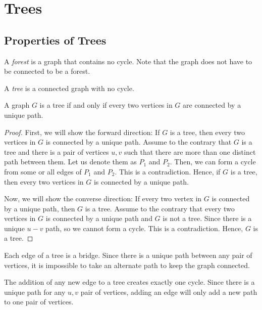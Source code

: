 \chapter{Trees}

\section{Properties of Trees}

\begin{definition}[Forests]
  A \textit{forest} is a graph that contains no cycle. Note that the graph 
  does not have to be connected to be a forest.
\end{definition}

\begin{definition}[Trees]
  A \textit{tree} is a connected graph with no cycle.
\end{definition}

\begin{theorem}
  A graph \(G\) is a tree if and only if every two vertices in \(G\) are
  connected by a unique path.
\end{theorem}

\begin{proof}
  First, we will show the forward direction: If \(G\) is a tree, then every two
  vertices in \(G\) is connected by a unique path. Assume to the contrary that
  \(G\) is a tree and there is a pair of vertices \(u, v\) such that there are 
  more than one distinct path between them. Let us denote them as \(P_1\) and
  \(P_2\). Then, we can form a cycle from some or all edges of \(P_1\) and 
  \(P_2\). This is a contradiction. Hence, if \(G\) is a tree, then every two
  vertices in \(G\) is connected by a unique path.

  Now, we will show the converse direction: If every two vertex in \(G\) is
  connected by a unique path, then \(G\) is a tree. Assume to the contrary that
  every two vertices in \(G\) is connected by a unique path and \(G\) is not a
  tree. Since there is a unique \(u-v\) path, so we cannot form a cycle. This is
  a contradiction. Hence, \(G\) is a tree.
\end{proof}

\begin{remark}
  Each edge of a tree is a bridge. Since there is a unique path between any pair
  of vertices, it is impossible to take an alternate path to keep the graph
  connected.
\end{remark}

\begin{remark}
  The addition of any new edge to a tree creates exactly one cycle. Since there
  is a unique path for any \(u, v\) pair of vertices, adding an edge will only
  add a new path to one pair of vertices.
\end{remark}


